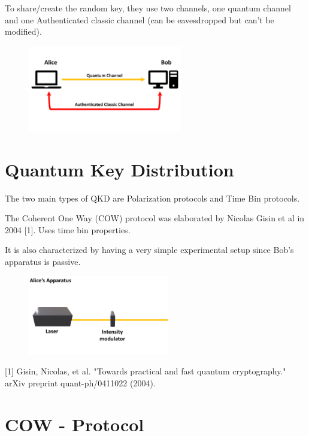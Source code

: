 \documentclass[40pt]{article}
\newcommand{\mysection}[1]{\section*{\color{black}\sffamily #1}}%
\begin{document}
To share/create the random key, they use two channels, one quantum channel and one Authenticated classic channel (can be eavesdropped but can't be modified).

  \begin{figure}[hbt]
    	\centering
    	\includegraphics[width=0.6\textwidth]{./figures/All.pdf}
        	\label{All}
    \end{figure}




\mysection{\Huge Quantum Key Distribution} \Large
\vspace*{1cm}
The two main types of QKD are Polarization protocols and Time Bin protocols.

The Coherent One Way (COW) protocol was elaborated by Nicolas Gisin et al in 2004 [1]. 
Uses time bin properties.

It is also characterized by having a very simple experimental setup since Bob's apparatus is passive.

    \begin{figure}[hbt]
    	\centering
    	\includegraphics[width=0.55\textwidth]{./figures/Alice.pdf}
        	\label{bob}
    \end{figure}

\large
[1] Gisin, Nicolas, et al. "Towards practical and fast quantum cryptography." arXiv preprint quant-ph/0411022 (2004).



\mysection{\Huge COW - Protocol}\Large
\vspace*{0.3cm}
\end{document}

